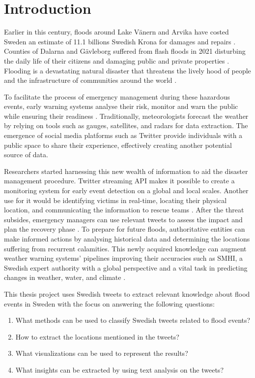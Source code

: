 \section{Introduction}

Earlier in this century, floods around Lake Vänern and Arvika have costed Sweden an estimate of 11.1
billions Swedish Krona for damages and repairs \cite{RiverFloodsSweden2022}. Counties of Dalarna and
Gävleborg suffered from flash floods in 2021 disturbing the daily life of their citizens and
damaging public and private properties \cite{daviesSwedenFlashFloods2021}.  Flooding is a
devastating natural disaster that threatens the lively hood of people and the infrastructure of
communities around the world \cite{Floodlist2021}.

To facilitate the process of emergency management during these hazardous events, early warning
systems analyse their risk, monitor and warn the public while ensuring their readiness
\cite{contributorsEarlyWarningSystem2022}. Traditionally, meteorologists forecast the weather by
relying on tools such as gauges, satellites, and radars for data extraction. The emergence of social
media platforms such as Twitter provide individuals with a public space to share their experience,
effectively creating another potential source of data.

Researchers started harnessing this new wealth of information to aid the disaster management
procedure.  Twitter streaming \ac{API} makes it possible to create a monitoring system for early event
detection on a global \cite{debruijnGlobalDatabaseHistoric2019b} and local
\cite{barkerDevelopmentNationalscaleRealtime2019} scales. Another use for it would be identifying
victims in real-time, locating their physical location, and communicating the information to rescue
teams \cite{singhEventClassificationLocation2019}. After the threat subsides, emergency
managers can use relevant tweets to assess the impact and plan the recovery phase
\cite{barkerDevelopmentNationalscaleRealtime2019}. To prepare for future floods, authoritative
entities can make informed actions by analysing historical data and determining the locations
suffering from recurrent calamities. This newly acquired knowledge can augment weather warning
systems' pipelines improving their accuracies such as \ac{SMHI}, a Swedish expert authority with a
global perspective and a vital task in predicting changes in weather, water, and climate \cite{SMHI2021}.

This thesis project uses Swedish tweets to extract relevant knowledge about flood events in Sweden
with the focus on answering the following questions:
\begin{enumerate}
  \item What methods can be used to classify Swedish tweets related to flood events?
  \item How to extract the locations mentioned in the tweets?
  \item What visualizations can be used to represent the results?
  \item What insights can be extracted by using text analysis on the tweets?
\end{enumerate}

